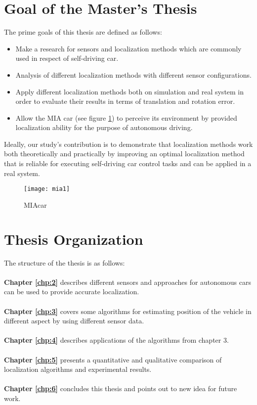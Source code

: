 \section{Goal of the Master's Thesis}\label{goal}
\par The prime goals of this thesis are defined as follows:
\begin{itemize}
    \item Make a research for sensors and localization methods which are commonly used in respect of self-driving car.
    \item Analysis of different localization methods with different sensor configurations.
    \item Apply different localization methods both on simulation and real system in order to evaluate their results in terms of translation and rotation error.
    \item Allow the MIA car (see figure \ref{fig:mia1}) to perceive its environment by provided localization ability for the purpose of autonomous driving.
\end{itemize} 
\par Ideally, our study’s contribution is to demonstrate that localization methods work both theoretically and practically by improving an optimal localization method that is reliable for executing self-driving car control tasks and can be applied in a real system.
\\
\begin{figure}[H]
    \centering
    \texttt{[image: mia1]}
    \caption{MIAcar}
    \label{fig:mia1}
\end{figure}
\section{Thesis Organization}
The structure of the thesis is as follows:\\
\\
\textbf{Chapter \ref{chp:2}} describes different sensors and approaches for autonomous cars can be used to provide accurate localization.\\
\\
\textbf{Chapter \ref{chp:3}} covers some algorithms for estimating position of the vehicle in different aspect by using different sensor data.\\
\\
\textbf{Chapter \ref{chp:4}} describes applications of the algorithms from chapter 3.\\
\\
\textbf{Chapter \ref{chp:5}}  presents a quantitative and qualitative comparison of localization algorithms and experimental results.\\
\\
\textbf{Chapter \ref{chp:6}}  concludes this thesis and points out to new idea for future work.